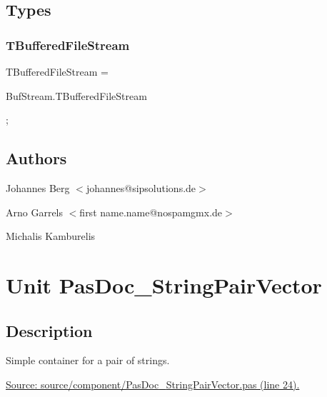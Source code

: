 \documentclass{report}
\newif\ifpdf
\begin{document}
\section{Types}
\ifpdf
\subsection*{\large{\textbf{TBufferedFileStream}}\normalsize\hspace{1ex}\hrulefill}
\else
\subsection*{TBufferedFileStream}
\fi
\label{PasDoc_StreamUtils-TBufferedFileStream}
\begin{list}{}{
\setlength{\itemindent}{0cm}
\setlength{\listparindent}{0cm}
\setlength{\leftmargin}{\evensidemargin}
\addtolength{\leftmargin}{\tmplength}
\settowidth{\labelsep}{X}
\addtolength{\leftmargin}{\labelsep}
\setlength{\labelwidth}{\tmplength}
}
\item[\textbf{Declaration}\hfill]
\ifpdf
\begin{flushleft}
\fi
\begin{ttfamily}
TBufferedFileStream =
    
       BufStream.TBufferedFileStream
      
    ;\end{ttfamily}

\ifpdf
\end{flushleft}
\fi

\end{list}
\section{Authors}
\par
Johannes Berg {$<$}johannes@sipsolutions.de{$>$}

\par
Arno Garrels {$<$}first name.name@nospamgmx.de{$>$}

\par
Michalis Kamburelis

\chapter{Unit PasDoc{\_}StringPairVector}
\label{PasDoc_StringPairVector}
\section{Description}
Simple container for a pair of strings.\par
\href{https://github.com/pasdoc/pasdoc/blob/master/source/component/PasDoc_StringPairVector.pas#L24}{Source: source/component/PasDoc{\_}StringPairVector.pas (line 24).}
\end{document}
